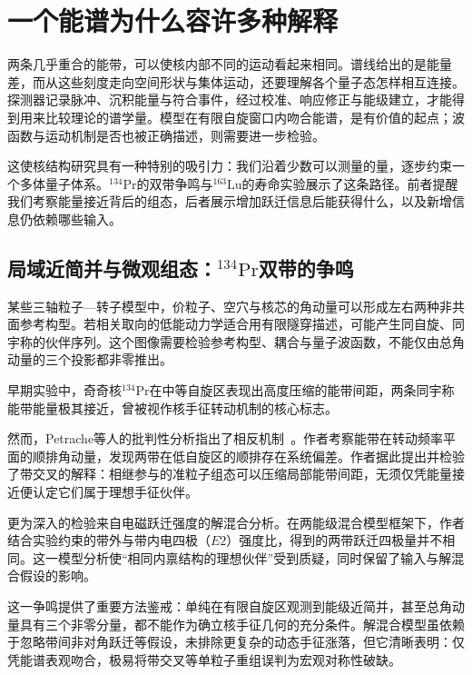 \section{一个能谱为什么容许多种解释}\label{sec:1-1}

两条几乎重合的能带，可以使核内部不同的运动看起来相同。谱线给出的是能量差，而从这些刻度走向空间形状与集体运动，还要理解各个量子态怎样相互连接。探测器记录脉冲、沉积能量与符合事件，经过校准、响应修正与能级建立，才能得到用来比较理论的谱学量。模型在有限自旋窗口内吻合能谱，是有价值的起点；波函数与运动机制是否也被正确描述，则需要进一步检验。

这使核结构研究具有一种特别的吸引力：我们沿着少数可以测量的量，逐步约束一个多体量子体系。$^{134}\mathrm{Pr}$的双带争鸣与$^{163}\mathrm{Lu}$的寿命实验展示了这条路径。前者提醒我们考察能量接近背后的组态，后者展示增加跃迁信息后能获得什么，以及新增信息仍依赖哪些输入。

\subsection{局域近简并与微观组态：\texorpdfstring{$^{134}\mathrm{Pr}$}{134Pr}双带的争鸣}\label{sec:1-1-1}

某些三轴粒子---转子模型中，价粒子、空穴与核芯的角动量可以形成左右两种非共面参考构型。若相关取向的低能动力学适合用有限隧穿描述，可能产生同自旋、同宇称的伙伴序列。这个图像需要检验参考构型、耦合与量子波函数，不能仅由总角动量的三个投影都非零推出。

早期实验中，奇奇核$^{134}\mathrm{Pr}$在中等自旋区表现出高度压缩的能带间距，两条同宇称能带能量极其接近，曾被视作核手征转动机制的核心标志。

然而，Petrache等人的批判性分析指出了相反机制~\cite{petrache-2006-near-degenerate-chiral-misinterpretation}。作者考察能带在转动频率平面的顺排角动量，发现两带在低自旋区的顺排存在系统偏差。作者据此提出并检验了带交叉的解释：相继参与的准粒子组态可以压缩局部能带间距，无须仅凭能量接近便认定它们属于理想手征伙伴。

更为深入的检验来自电磁跃迁强度的解混合分析。在两能级混合模型框架下，作者结合实验约束的带外与带内电四极（$E2$）强度比，得到的两带跃迁四极量并不相同。这一模型分析使``相同内禀结构的理想伙伴''受到质疑，同时保留了输入与解混合假设的影响。

这一争鸣提供了重要方法鉴戒：单纯在有限自旋区观测到能级近简并，甚至总角动量具有三个非零分量，都不能作为确立核手征几何的充分条件。解混合模型虽依赖于忽略带间非对角跃迁等假设，未排除更复杂的动态手征涨落，但它清晰表明：仅凭能谱表观吻合，极易将带交叉等单粒子重组误判为宏观对称性破缺。

